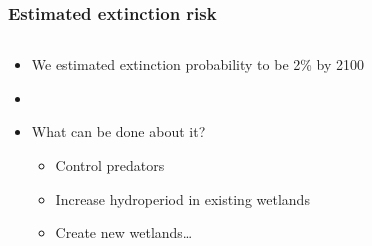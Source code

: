 \documentclass[color=usenames,dvipsnames]{beamer}
\begin{document}
\begin{frame}
  \frametitle{Estimated extinction risk}
  \begin{columns}
    \begin{column}{0.6\textwidth}
      \begin{itemize}%
      \item<1-> We estimated extinction probability to be 2\% by 2100
      \item[]
      \item<2-> What can be done about it?
        \begin{itemize}
        \item<3-> Control predators
        \item<4-> Increase hydroperiod in existing wetlands
        \item<5-> Create new wetlands\dots
        \end{itemize}
      \end{itemize}
    \end{column}
    \begin{column}{0.4\textwidth}
      \begin{center}

\end{center}
\end{column}
\end{columns}
\end{frame}
\end{document}
